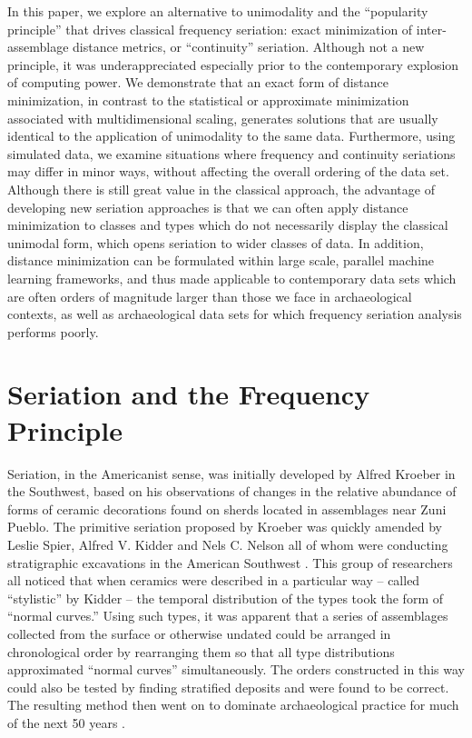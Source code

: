 \documentclass[graybox,natbib]{svmult}
\begin{document}
In this paper, we explore an alternative to unimodality and the
``popularity principle'' that drives classical frequency seriation:
exact minimization of inter-assemblage distance metrics, or
``continuity'' seriation. Although not a new principle, it was
underappreciated especially prior to the contemporary explosion of
computing power. We demonstrate that an exact form of distance
minimization, in contrast to the statistical or approximate minimization
associated with multidimensional scaling, generates solutions that are
usually identical to the application of unimodality to the same data.
Furthermore, using simulated data, we examine situations where frequency
and continuity seriations may differ in minor ways, without affecting
the overall ordering of the data set. Although there is still great
value in the classical approach, the advantage of developing new
seriation approaches is that we can often apply distance minimization to
classes and types which do not necessarily display the classical
unimodal form, which opens seriation to wider classes of data. In
addition, distance minimization can be formulated within large scale,
parallel machine learning frameworks, and thus made applicable to
contemporary data sets which are often orders of magnitude larger than
those we face in archaeological contexts, as well as archaeological data
sets for which frequency seriation analysis performs poorly.

\section{Seriation and the Frequency
Principle}\label{seriation-and-the-frequency-principle}

Seriation, in the Americanist sense, was initially developed by Alfred
Kroeber \citep{Kroeber1916} in the Southwest, based on his observations
of changes in the relative abundance of forms of ceramic decorations
found on sherds located in assemblages near Zuni Pueblo. The primitive
seriation proposed by Kroeber was quickly amended by Leslie Spier,
Alfred V. Kidder and Nels C. Nelson all of whom were conducting
stratigraphic excavations in the American Southwest
\citep{Kidder1917, Nelson1916, Spier1917}. This group of researchers all
noticed that when ceramics were described in a particular way -- called
``stylistic'' by Kidder \citeyearpar{Kidder1917} -- the temporal
distribution of the types took the form of ``normal curves.'' Using such
types, it was apparent that a series of assemblages collected from the
surface or otherwise undated could be arranged in chronological order by
rearranging them so that all type distributions approximated ``normal
curves'' simultaneously. The orders constructed in this way could also
be tested by finding stratified deposits and were found to be correct.
The resulting method then went on to dominate archaeological practice
for much of the next 50 years \citep{lyman1997rise}.
\end{document}
